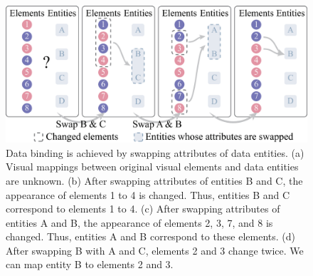 \begin{figure}
    \centering
    \includegraphics[width=1\columnwidth]{figures/DataBinding.eps}
    \caption{Data binding is achieved by swapping attributes of data entities. (a) Visual mappings between original visual elements and data entities are unknown. (b) After swapping attributes of entities B and C, the appearance of elements 1 to 4 is changed. Thus, entities B and C correspond to elements 1 to 4. (c) After swapping attributes of entities A and B, the appearance of elements 2, 3, 7, and 8 is changed. Thus, entities A and B correspond to these elements. (d) After swapping B with A and C, elements 2 and 3 change twice. We can map entity B to elements 2 and 3.}
    \label{fig:DataBinding}
\end{figure}

